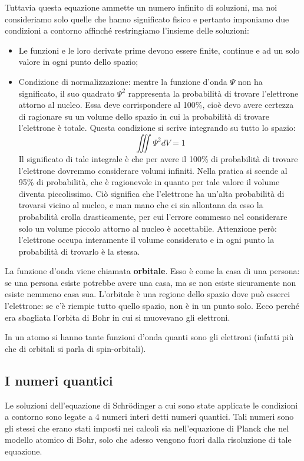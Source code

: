 Tuttavia questa equazione ammette un numero infinito di soluzioni, ma noi consideriamo solo quelle che hanno significato fisico e pertanto imponiamo due condizioni a contorno affinché restringiamo l'insieme delle soluzioni:
\begin{itemize}
  \item  Le funzioni e le loro derivate prime devono essere finite, continue e ad un solo valore in ogni punto dello spazio;
  \item Condizione di normalizzazione: mentre la funzione d'onda $\Psi$ non ha significato, il suo quadrato $\Psi^2$ rappresenta la probabilità di trovare l'elettrone attorno al nucleo. Essa deve corrispondere al 100\%, cioè devo avere certezza di ragionare su un volume dello spazio in cui la probabilità di trovare l'elettrone è totale. Questa condizione si scrive integrando su tutto lo spazio:
  $$\iiint \Psi^2dV=1$$
  Il significato di tale integrale è che per avere il 100\% di probabilità di trovare l'elettrone dovremmo considerare volumi infiniti. Nella pratica si scende al 95\% di probabilità, che è ragionevole in quanto per tale valore il volume diventa piccolissimo. Ciò significa che l'elettrone ha un'alta probabilità di trovarsi vicino al nucleo, e man mano che ci sia allontana da esso la probabilità crolla drasticamente, per cui l'errore commesso nel considerare solo un volume piccolo attorno al nucleo è accettabile. Attenzione però: l'elettrone occupa interamente il volume considerato e in ogni punto la probabilità di trovarlo è la stessa.
\end{itemize}
La funzione d'onda viene chiamata \textbf{orbitale}. Esso è come la casa di una persona: se una persona esiste potrebbe avere una casa, ma se non esiste sicuramente non esiste nemmeno casa sua. L'orbitale è una regione dello spazio dove può esserci l'elettrone: se c'è riempie tutto quello spazio, non è in un punto solo. Ecco perché era sbagliata l'orbita di Bohr in cui si muovevano gli elettroni. 

In un atomo si hanno tante funzioni d'onda quanti sono gli elettroni (infatti più che di orbitali si parla di spin-orbitali).
\subsection{I numeri quantici}
Le soluzioni dell'equazione di Schrödinger a cui sono state applicate le condizioni a contorno sono legate a 4 numeri interi detti numeri quantici. Tali numeri sono gli stessi che erano stati imposti nei calcoli sia nell'equazione di Planck che nel modello atomico di Bohr, solo che adesso vengono fuori dalla risoluzione di tale equazione.

